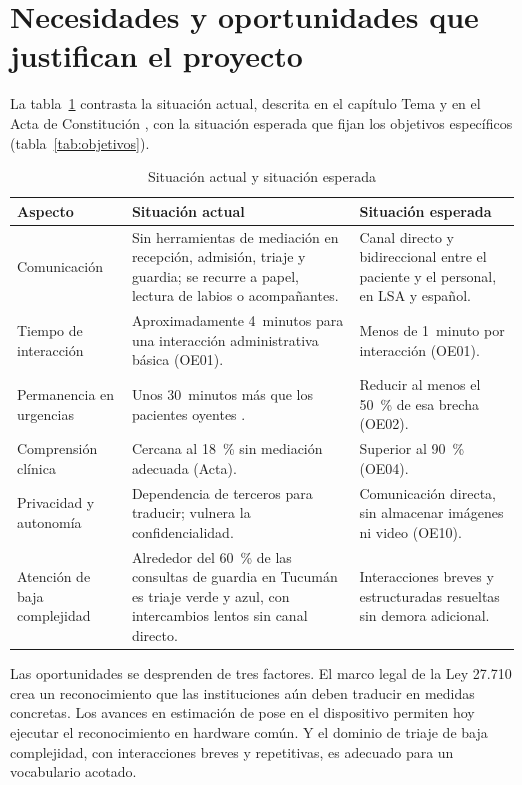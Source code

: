 \section{Necesidades y oportunidades que justifican el proyecto}

La tabla~\ref{tab:necesidades} contrasta la situación actual, descrita en el capítulo Tema y en el Acta de Constitución \parencite{actaconstitucion2026}, con la situación esperada que fijan los objetivos específicos (tabla~\ref{tab:objetivos}).

\begin{table}[H]
  \centering
  \caption{Situación actual y situación esperada}\label{tab:necesidades}
  \small
  \begin{tabularx}{\textwidth}{>{\raggedright\arraybackslash}p{2.9cm} >{\raggedright\arraybackslash}X >{\raggedright\arraybackslash}X}
    \toprule
    \textbf{Aspecto} & \textbf{Situación actual} & \textbf{Situación esperada} \\
    \midrule
    Comunicación & Sin herramientas de mediación en recepción, admisión, triaje y guardia; se recurre a papel, lectura de labios o acompañantes. & Canal directo y bidireccional entre el paciente y el personal, en LSA y español. \\
    Tiempo de interacción & Aproximadamente 4~minutos para una interacción administrativa básica (OE01). & Menos de 1~minuto por interacción (OE01). \\
    Permanencia en urgencias & Unos 30~minutos más que los pacientes oyentes \parencite{james2022ed}. & Reducir al menos el 50~\% de esa brecha (OE02). \\
    Comprensión clínica & Cercana al 18~\% sin mediación adecuada (Acta). & Superior al 90~\% (OE04). \\
    Privacidad y autonomía & Dependencia de terceros para traducir; vulnera la confidencialidad. & Comunicación directa, sin almacenar imágenes ni video (OE10). \\
    Atención de baja complejidad & Alrededor del 60~\% de las consultas de guardia en Tucumán es triaje verde y azul, con intercambios lentos sin canal directo. & Interacciones breves y estructuradas resueltas sin demora adicional. \\
    \bottomrule
  \end{tabularx}
\end{table}

Las oportunidades se desprenden de tres factores. El marco legal de la Ley 27.710 crea un reconocimiento que las instituciones aún deben traducir en medidas concretas. Los avances en estimación de pose en el dispositivo \parencite{zhang2020mediapipehands} permiten hoy ejecutar el reconocimiento en hardware común. Y el dominio de triaje de baja complejidad, con interacciones breves y repetitivas, es adecuado para un vocabulario acotado.

